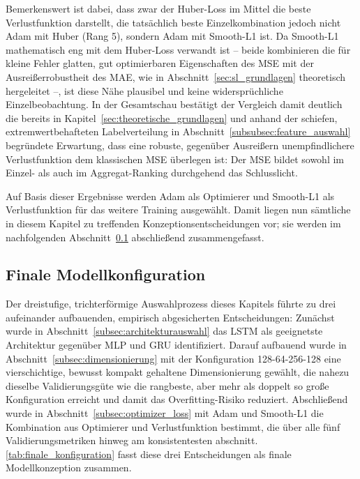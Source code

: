 Bemerkenswert ist dabei, dass zwar der Huber-Loss im Mittel die beste Verlustfunktion darstellt, die tatsächlich beste Einzelkombination jedoch nicht \gls{Adam} mit Huber (Rang 5), sondern \gls{Adam} mit Smooth-L1 ist. Da Smooth-L1 mathematisch eng mit dem Huber-Loss verwandt ist -- beide kombinieren die für kleine Fehler glatten, gut optimierbaren Eigenschaften des \gls{MSE} mit der Ausreißerrobustheit des \gls{MAE}, wie in Abschnitt~\ref{sec:sl_grundlagen} theoretisch hergeleitet --, ist diese Nähe plausibel und keine widersprüchliche Einzelbeobachtung. In der Gesamtschau bestätigt der Vergleich damit deutlich die bereits in Kapitel~\ref{sec:theoretische_grundlagen} und anhand der schiefen, extremwertbehafteten Labelverteilung in Abschnitt~\ref{subsubsec:feature_auswahl} begründete Erwartung, dass eine robuste, gegenüber Ausreißern unempfindlichere Verlustfunktion dem klassischen \gls{MSE} überlegen ist: Der \gls{MSE} bildet sowohl im Einzel- als auch im Aggregat-Ranking durchgehend das Schlusslicht.

Auf Basis dieser Ergebnisse werden \gls{Adam} als Optimierer und Smooth-L1 als Verlustfunktion für das weitere Training ausgewählt. Damit liegen nun sämtliche in diesem Kapitel zu treffenden Konzeptionsentscheidungen vor; sie werden im nachfolgenden Abschnitt~\ref{subsec:finale_konfiguration} abschließend zusammengefasst.

\subsection{Finale Modellkonfiguration}
\label{subsec:finale_konfiguration}

Der dreistufige, trichterförmige Auswahlprozess dieses Kapitels führte zu drei aufeinander aufbauenden, empirisch abgesicherten Entscheidungen: Zunächst wurde in Abschnitt~\ref{subsec:architekturauswahl} das \gls{LSTM} als geeignetste Architektur gegenüber \gls{MLP} und \gls{GRU} identifiziert. Darauf aufbauend wurde in Abschnitt~\ref{subsec:dimensionierung} mit der Konfiguration 128-64-256-128 eine vierschichtige, bewusst kompakt gehaltene Dimensionierung gewählt, die nahezu dieselbe Validierungsgüte wie die rangbeste, aber mehr als doppelt so große Konfiguration erreicht und damit das Overfitting-Risiko reduziert. Abschließend wurde in Abschnitt~\ref{subsec:optimizer_loss} mit \gls{Adam} und Smooth-L1 die Kombination aus Optimierer und Verlustfunktion bestimmt, die über alle fünf Validierungsmetriken hinweg am konsistentesten abschnitt. \autoref{tab:finale_konfiguration} fasst diese drei Entscheidungen als finale Modellkonzeption zusammen.

